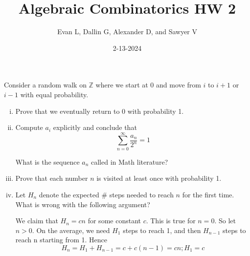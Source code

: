 \documentclass[11pt]{scrartcl}
\title{Algebraic Combinatorics HW 2}
\author{Evan L, Dallin G, Alexander D, and Sawyer V}
\date{2-13-2024}
\begin{document}
\maketitle
\setcounter{section}{1}
\begin{problem}
    Consider a random walk on $\mathbb{Z}$ where we start at 0 and move from $i$ to $i + 1$ or $i - 1$ with equal probability.

    \begin{enumerate}[(i)]
        \item Prove that we eventually return to 0 with probability 1.
        \item Compute $a_i$ explicitly and conclude that
        \[
            \sum_{n=0}^{\infty} \frac{a_n}{2^n} = 1
        \]

        What is the sequence ${a_n}$ called in Math literature?
        \item Prove that each number $n$ is visited at least once with probability 1.
        \item Let $H_n$ denote the expected \# steps needed to reach $n$ for the first time. What is wrong with the
        following argument?

        We claim that $H_n = cn$ for some constant $c$. This is true for $n = 0$. So let $n > 0$. On the average, we need $H_1$ steps to reach 1, and then $H_{n-1}$ steps to reach n starting from 1. Hence
        \[
            H_n = H_1 + H_{n-1} = c + c(n-1) = cn ; H_1 = c
        \]
    \end{enumerate}
\end{problem}
\end{document}

